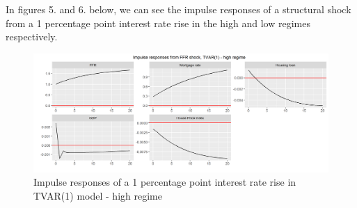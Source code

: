\documentclass[12pt,a4paper]{article}
\begin{document}
\noindent In figures 5. and 6. below, we can see the impulse responses of a structural shock from a 1 percentage point interest rate rise in the high and low regimes respectively.
 \begin{center}
	\begin{figure}[h!]
		\includegraphics[width = \textwidth]{tvarhigh.png}
		\caption{Impulse responses of a 1 percentage point interest rate rise in TVAR(1) model - high regime}
	\end{figure}
\end{center}
\end{document}
